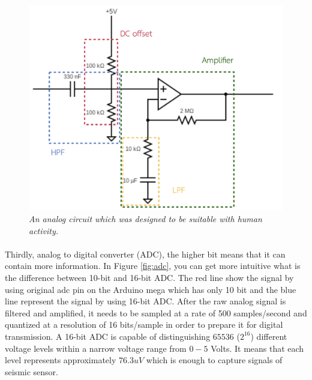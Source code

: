 \begin{figure}[H]
  \centering
  \caption[An analog circuit which was designed to be suitable with human activity]{\emph{An analog circuit which was designed to be suitable with human activity.}}\label{fig:analog_circuit}
  \includegraphics[scale = 0.3]{figures/analogcircuit.jpg}  
\end{figure}

\paragraph{}
Thirdly, analog to digital converter (ADC), the higher bit means that it can contain more information. In Figure \ref{fig:adc}, you can get more intuitive what is the difference between 10-bit and 16-bit ADC.  The red line show the signal by using original adc pin on the Arduino mega which has only 10 bit and the blue line represent the signal by using 16-bit ADC. After the raw analog signal is filtered and amplified, it needs to be sampled at a rate of 500 samples/second and quantized at a resolution of 16 bits/sample in order to prepare it for digital transmission. A 16-bit ADC is capable of distinguishing $65536$ ($2^{16}$) different voltage levels within a narrow voltage range from $0 - 5$ Volts. It means that each level represents approximately $76.3 uV$ which is enough to capture signals of seismic sensor.

